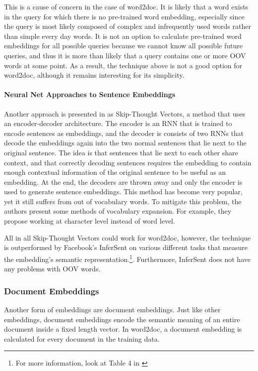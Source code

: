 This is a cause of concern in the case of word2doc. It is likely that a word exists in the query for which there is no
pre-trained word embedding, especially since the query is most likely composed of complex and infrequently used words rather than
simple every day words. It is not an option to calculate pre-trained word embeddings for all possible queries because we cannot
know all possible future queries, and thus it is more than likely that a query contains one or more OOV words at some point.
As a result, the technique above is not a good option for word2doc, although it remains interesting for its simplicity.


\paragraph{Neural Net Approaches to Sentence Embeddings}

Another approach is presented in \citet{skipthought} as Skip-Thought Vectors, a method that uses an encoder-decoder architecture.
The encoder is an RNN that is trained to encode sentences as embeddings, and the decoder is consists of two RNNs that decode the
embeddings again into the two normal sentences that lie next to the original sentence. The idea is that sentences that lie next to
each other share context, and that correctly decoding sentences requires the embedding to contain enough contextual information of
the original sentence to be useful as an embedding. At the end, the decoders are thrown away and only the encoder is used to
generate sentence embeddings. This method has become very popular, yet it still suffers from out of vocabulary words.
To mitigate this problem, the authors present some methods of vocabulary expansion. For example, they propose working at
character level instead of word level.

All in all Skip-Thought Vectors could work for word2doc, however, the technique is outperformed by Facebook's InferSent
\citep{infersent} on various different tasks that measure the embedding's semantic representation.\footnote{For more information,
look at Table 4 in \citep{infersent}}. Furthermore, InferSent does not have any problems with OOV words.

\subsubsection{Document Embeddings}

Another form of embeddings are document embeddings. Just like other embeddings, document embeddings encode the semantic meaning
of an entire document inside a fixed length vector. In word2doc, a document embedding is calculated for every document in the
training data.

